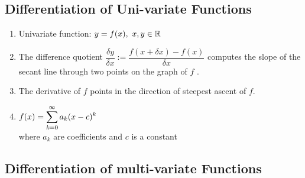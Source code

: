 \subsection{Differentiation of Uni-variate Functions}

\begin{enumerate}
    \item 
    \begin{definition}
        Univariate function: $y = f(x),\ x, y \in \mathbb{R}$
        \hfill \cite{mfml/book/mml/Deisenroth-Faisal-Ong}
    \end{definition}

    \item 
    \begin{definition}
        The difference quotient
        $
            \dfrac{\delta y}{\delta x} 
            := \dfrac{f(x + \delta x) - f(x)}{\delta x}
        $
        computes the slope of the secant line through two points on the graph of $f$ .
        \hfill \cite{mfml/book/mml/Deisenroth-Faisal-Ong}
    \end{definition}

    \item The derivative of $f$ points in the direction of steepest ascent of $f$. 
    \hfill \cite{mfml/book/mml/Deisenroth-Faisal-Ong}

    \item 
    \begin{definition}
        $
            f(x) = \displaystyle\sum_{k=0}^{\infty} a_k (x-c)^k
        $
        \\
        where $a_k$ are coefficients and $c$ is a constant
    \end{definition}

\end{enumerate}




\subsection{Differentiation of multi-variate Functions}

